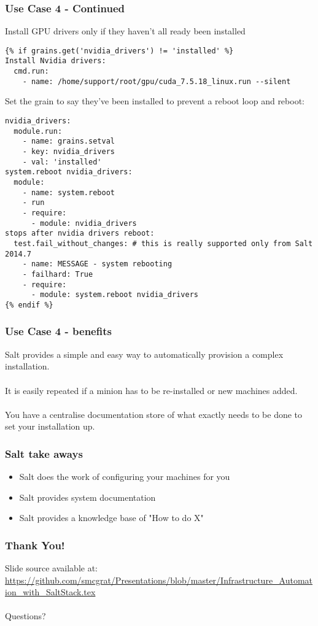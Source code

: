\documentclass{beamer}
\begin{document}
\begin{frame}[fragile]
\frametitle{Use Case 4 - Continued}

Install GPU drivers only if they haven't all ready been installed \\

\begin{lstlisting}[basicstyle=\tiny,]
{% if grains.get('nvidia_drivers') != 'installed' %}
Install Nvidia drivers:
  cmd.run:
    - name: /home/support/root/gpu/cuda_7.5.18_linux.run --silent
\end{lstlisting}

Set the grain to say they've been installed to prevent a reboot loop and reboot:\\

\begin{lstlisting}[basicstyle=\tiny,]
nvidia_drivers:
  module.run:
    - name: grains.setval
    - key: nvidia_drivers
    - val: 'installed'
system.reboot nvidia_drivers:
  module:
    - name: system.reboot
    - run
    - require:
      - module: nvidia_drivers
stops after nvidia drivers reboot:
  test.fail_without_changes: # this is really supported only from Salt 2014.7
    - name: MESSAGE - system rebooting
    - failhard: True
    - require:
      - module: system.reboot nvidia_drivers
{% endif %}
\end{lstlisting}
\end{frame}

\begin{frame}
\frametitle{Use Case 4 - benefits}

Salt provides a simple and easy way to automatically provision a complex installation.\\~\\

It is easily repeated if a minion has to be re-installed or new machines added.\\~\\

You have a centralise documentation store of what exactly needs to be done to set your installation up.

\end{frame}

\begin{frame}
\frametitle{Salt take aways}
\begin{itemize}
\item Salt does the work of configuring your machines for you
\item Salt provides system documentation
\item Salt provides a knowledge base of "How to do X"
\end{itemize}
\end{frame}

\begin{frame}[fragile]
\frametitle{Thank You!}
Slide source available at: \url{https://github.com/smcgrat/Presentations/blob/master/Infrastructure_Automation_with_SaltStack.tex} \\~\\
Questions?
\end{frame}
\end{document}
